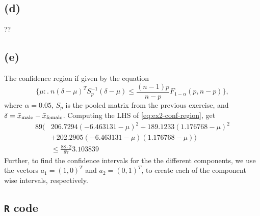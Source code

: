 \subsection*{(d)}
\label{sec:d}
??

\subsection*{(e)}
\label{sec:e}

The confidence region if given by the equation
\begin{equation}
  \label{eq:ex2-conf-region}
 \{\mu:.\ n (\delta - \mu)^T S_p^{-1} (\delta-\mu)\leq \frac{(n-1)p}{n-p}F_{1-\alpha}(p,n-p)\},
\end{equation}
where $\alpha = 0.05$, $S_p$ is the pooled matrix from the previous
exercise, and $\delta = \bar{x}_{\rm male}  - \bar{x}_{\rm
  female}$. Computing the LHS of \eqref{eq:ex2-conf-region}, get
\begin{align*}
  89
  \big(
    &206.7294 ( - 6.463131 -\mu)^2 + 189.1233(1.176768 -\mu)^2 \\
    &+ 202.2905(- 6.463131 - \mu)(1.176768- \mu)
  \big)\\
  &\leq \frac{88\cdot 2}{87}3.103839
\end{align*}
Further, to find the confidence intervals for the the different
components, we use the vectors $a_1 = (1,0)^T$ and $a_2 = (0,1)^T$, to
create each of the component wise intervals, respectively. 
\subsection*{\texttt{R} code}
\label{sec:textttr-code}



